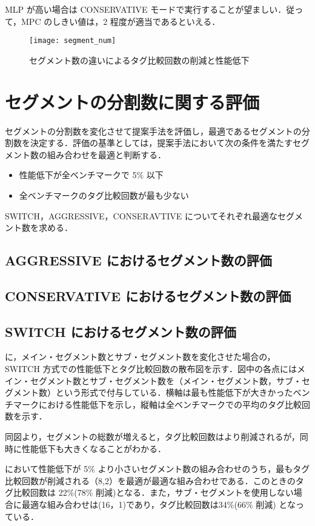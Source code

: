 MLP が高い場合は CONSERVATIVE モードで実行することが望ましい．従って，MPC のしきい値は，2 程度が適当であるといえる．

\begin{figure}[htb]
  \centering
  \texttt{[image: segment\_num]}
  \caption{セグメント数の違いによるタグ比較回数の削減と性能低下}
  \label{fig:segment_num}
\end{figure}

\section{セグメントの分割数に関する評価}
\label{sec:ipc_comp}
セグメントの分割数を変化させて提案手法を評価し，最適であるセグメントの分割数を決定する．評価の基準としては，提案手法において次の条件を満たすセグメント数の組み合わせを最適と判断する．
\begin{itemize}
  \item 性能低下が全ベンチマークで 5\% 以下
  \item 全ベンチマークのタグ比較回数が最も少ない
\end{itemize}

SWITCH，AGGRESSIVE，CONSERAVTIVE についてそれぞれ最適なセグメント数を求める．

\subsection{AGGRESSIVE におけるセグメント数の評価}

\subsection{CONSERVATIVE におけるセグメント数の評価}

\subsection{SWITCH におけるセグメント数の評価}
に，メイン・セグメント数とサブ・セグメント数を変化させた場合の，SWITCH 方式での性能低下とタグ比較回数の散布図を示す．図中の各点にはメイン・セグメント数とサブ・セグメント数を（メイン・セグメント数，サブ・セグメント数）という形式で付与している．横軸は最も性能低下が大きかったベンチマークにおける性能低下を示し，縦軸は全ベンチマークでの平均のタグ比較回数を示す．

同図より，セグメントの総数が増えると，タグ比較回数はより削減されるが，同時に性能低下も大きくなることがわかる．

において性能低下が 5\% より小さいセグメント数の組み合わせのうち，最もタグ比較回数が削減される（8,2）を最適が最適な組み合わせである．このときのタグ比較回数は 22\%(78\% 削減)となる．また，サブ・セグメントを使用しない場合に最適な組み合わせは(16，1)であり，タグ比較回数は34\%(66\% 削減) となっている．

